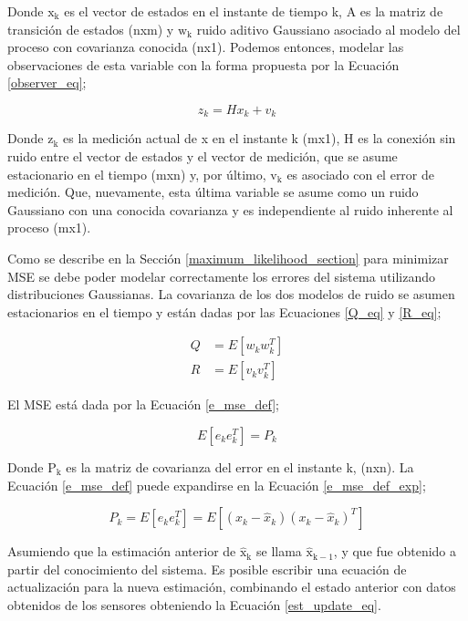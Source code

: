 \documentclass[10pt, a4paper]{report}
\begin{document}
\noindent Donde $\mathrm{x_k}$ es el vector de estados en el instante de tiempo 
k, A es la matriz de transici\'on de estados (nxm) y $\mathrm{w_k}$ ruido 
aditivo Gaussiano asociado al modelo del proceso con covarianza conocida (nx1). 
Podemos entonces, modelar las observaciones de esta variable con la forma 
propuesta por la Ecuaci\'on \ref{observer_eq};

\begin{equation}
    z_k = Hx_k + v_k \label{observer_eq}
\end{equation}

\noindent Donde $\mathrm{z_k}$ es la medici\'on actual de x en el instante k 
(mx1), H es la conexi\'on sin ruido entre el vector de estados y el vector de 
medici\'on, que se asume estacionario en el tiempo (mxn) y, por \'ultimo, 
$\mathrm{v_k}$ es asociado con el error de medici\'on. Que, nuevamente, esta 
\'ultima variable se asume como un ruido Gaussiano con una conocida covarianza y 
es independiente al ruido inherente al proceso (mx1).

\noindent Como se describe en la Secci\'on \ref{maximum_likelihood_section} para
minimizar \acrshort{MSE} se debe poder modelar correctamente los errores del
sistema utilizando distribuciones Gaussianas. La covarianza de los dos modelos
de ruido se asumen estacionarios en el tiempo y est\'an dadas por las Ecuaciones
\ref{Q_eq} y \ref{R_eq};

\begin{align}
    Q &= E\left[w_kw_k^T\right] \label{Q_eq} \\
    R &= E\left[v_kv_k^T\right] \label{R_eq}
\end{align}

El \acrshort{MSE} est\'a dada por la Ecuaci\'on \ref{e_mse_def};

\begin{equation}
    E\left[e_ke_k^T\right] = P_k \label{e_mse_def}
\end{equation}

Donde $\mathrm{P_k}$ es la matriz de covarianza del error en el instante k, 
(nxn). La Ecuaci\'on \ref{e_mse_def} puede expandirse en la Ecuaci\'on
\ref{e_mse_def_exp};

\begin{equation}
    P_k = E\left[e_ke_k^T\right] = E\left[\left(x_k - \hat{x}_k\right)\left(x_k -
    \hat{x}_k\right)^T\right]\label{e_mse_def_exp}
\end{equation}

Asumiendo que la estimaci\'on anterior de $\mathrm{\hat{x}_k}$ se llama
$\mathrm{\hat{x}_{k-1}}$, y que fue obtenido a partir del conocimiento del
sistema. Es posible escribir una ecuaci\'on de actualizaci\'on para la nueva
estimaci\'on, combinando el estado anterior con datos obtenidos de los sensores
obteniendo la Ecuaci\'on \ref{est_update_eq}.
\end{document}
